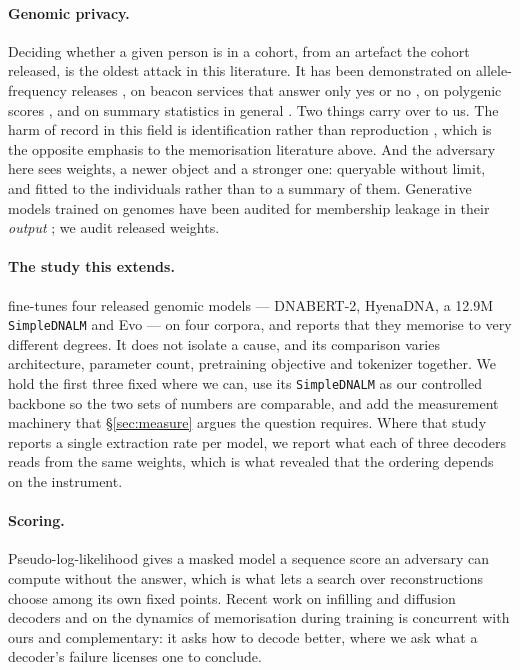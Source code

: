 \paragraph{Genomic privacy.}
Deciding whether a given person is in a cohort, from an artefact the cohort released, is the oldest
attack in this literature. It has been demonstrated on allele-frequency releases
\citep{homer2008resolving}, on beacon services that answer only yes or no
\citep{shringarpure2015beacon,vonthenen2019reidentification}, on polygenic scores
\citep{paige2021reconstructing,nikitin2026prs}, and on summary statistics in general
\citep{li2013membership,tramer2015bounded}. Two things carry over to us. The harm of record in this
field is identification rather than reproduction \citep{erlich2014routes}, which is the opposite
emphasis to the memorisation literature above. And the adversary here sees weights, a newer object
and a stronger one: queryable without limit, and fitted to the individuals rather than to a summary
of them. Generative models trained on genomes have been audited for membership leakage in their
\emph{output} \citep{oprisanu2022synthetic,belfiore2025bihmia}; we audit released weights.

\paragraph{The study this extends.}
\citet{nemecek2026quantifying} fine-tunes four released genomic models --- DNABERT-2, HyenaDNA, a
12.9M \texttt{SimpleDNALM} and Evo --- on four corpora, and reports that they memorise to very
different degrees. It does not isolate a cause, and its comparison varies architecture, parameter
count, pretraining objective and tokenizer together. We hold the first three fixed where we can,
use its \texttt{SimpleDNALM} as our controlled backbone so the two sets of numbers are comparable,
and add the measurement machinery that \S\ref{sec:measure} argues the question requires. Where that
study reports a single extraction rate per model, we report what each of three decoders reads from
the same weights, which is what revealed that the ordering depends on the instrument.

\paragraph{Scoring.}
Pseudo-log-likelihood \citep{salazar2020pll} gives a masked model a sequence score an adversary can
compute without the answer, which is what lets a search over reconstructions choose among its own
fixed points. Recent work on infilling and diffusion decoders
\citep{wang2026infilling,luo2026diffusion} and on the dynamics of memorisation during training
\citep{vonarx2026dynamics} is concurrent with ours and complementary: it asks how to decode better,
where we ask what a decoder's failure licenses one to conclude.
